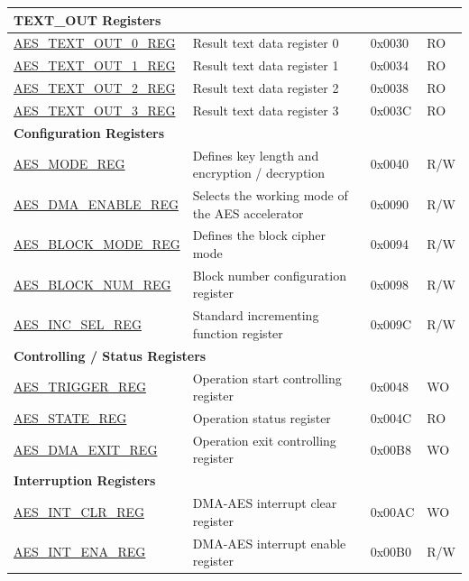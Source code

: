 \begin{longtable}{ | p{5.2cm} | p{6.6cm} | p{2cm} | p{1.2cm} | }
\multicolumn{4}{|l|}{\textbf{TEXT\_OUT Registers}} \\ \hline

\hyperref[regdesc:AESTEXTOUTnREG]{AES\_TEXT\_OUT\_0\_REG}		&	Result text data register 0					& 0x0030 & RO \\ \hline
\hyperref[regdesc:AESTEXTOUTnREG]{AES\_TEXT\_OUT\_1\_REG}		&	Result text data register 1					& 0x0034 & RO \\ \hline
\hyperref[regdesc:AESTEXTOUTnREG]{AES\_TEXT\_OUT\_2\_REG}		&	Result text data register 2					& 0x0038 & RO \\ \hline
\hyperref[regdesc:AESTEXTOUTnREG]{AES\_TEXT\_OUT\_3\_REG}		&	Result text data register 3					& 0x003C & RO \\ \hline

\multicolumn{4}{|l|}{\textbf{Configuration Registers}} \\ \hline

\hyperref[regdesc:AESMODEREG]{AES\_MODE\_REG}				            &	Defines key length and encryption / decryption			    & 0x0040 & R/W \\ \hline
\hyperref[regdesc:AESDMAENABLEREG]{AES\_DMA\_ENABLE\_REG}		        &	Selects the working mode of the AES accelerator					                & 0x0090 & R/W \\ \hline
\hyperref[regdesc:AESBLOCKMODEREG]{AES\_BLOCK\_MODE\_REG}		        &	Defines the block cipher mode			        & 0x0094 & R/W \\ \hline
\hyperref[regdesc:AESBLOCKNUMREG]{AES\_BLOCK\_NUM\_REG}		   	        &	Block number configuration register			        & 0x0098 & R/W \\ \hline
\hyperref[regdesc:AESINCSELREG]{AES\_INC\_SEL\_REG}			            &	Standard incrementing function register               & 0x009C & R/W \\ \hline

\multicolumn{4}{|l|}{\textbf{Controlling / Status Registers}} \\ \hline

\hyperref[regdesc:AESTRIGGERREG]{AES\_TRIGGER\_REG}			&	Operation start controlling register		& 0x0048 & WO \\ \hline
\hyperref[regdesc:AESSTATEREG]{AES\_STATE\_REG}				&	Operation status register			& 0x004C & RO \\ \hline
\hyperref[regdesc:AESDMAEXITREG]{AES\_DMA\_EXIT\_REG}		&	Operation exit controlling register	& 0x00B8 & WO \\ \hline

\multicolumn{4}{|l|}{\textbf{Interruption Registers}} \\ \hline

\hyperref[regdesc:AESINTCLRREG]{AES\_INT\_CLR\_REG}			&	DMA-AES interrupt clear register	& 0x00AC & WO \\ \hline
\hyperref[regdesc:AESINTENAREG]{AES\_INT\_ENA\_REG}			&	DMA-AES interrupt enable register	& 0x00B0 & R/W \\ \hline

\end{longtable}
